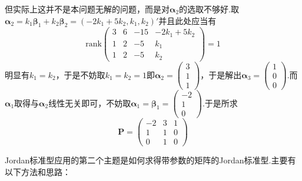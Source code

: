 {\begin{solution}
        但实际上这并不是本问题无解的问题，而是对$\bm{\alpha}_2$的选取不够好.取$\bm{\alpha}_2=k_1\bm{\beta}_1+k_2\bm{\beta}_2=\left(
            -2k_1+5k_2,k_1,k_2
            \right)'$并且此处应当有\[
            \mathrm{rank}\begin{pmatrix}
                3 & 6 & -15 & -2k_1+5k_2 \\1&2&-5&k_1\\1 & 2 & -5 & k_2
            \end{pmatrix}=1
        \]明显有$k_1=k_2$，于是不妨取$k_1=k_2=1$即$\bm{\alpha}_2=\begin{pmatrix}
                3 \\1\\1
            \end{pmatrix}$，于是解出$\bm{\alpha}_3=\begin{pmatrix}
                1 \\0\\0
            \end{pmatrix}$.而$\bm{\alpha}_1$取得与$\bm{\alpha}_2$线性无关即可，不妨取$\bm{\alpha}_1=\bm{\beta}_1=\begin{pmatrix}
                -2 \\1\\0
            \end{pmatrix}$.于是所求\[
            \bm{P}= \begin{pmatrix}
                -2 & 3 & 1 \\1&1&0\\0 & 1 & 0
            \end{pmatrix}
        \]
    \end{solution}
}
Jordan标准型应用的第二个主题是如何求得带参数的矩阵的Jordan标准型.主要有以下方法和思路：

